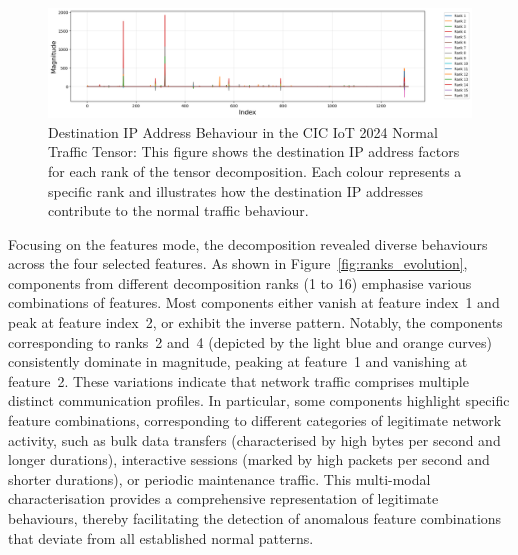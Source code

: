 \documentclass[pdflatex,sn-mathphys-num]{sn-jnl}
\theoremstyle{thmstyleone}
\theoremstyle{thmstyletwo}
\theoremstyle{thmstylethree}
\begin{document}
\begin{figure}[H]
    \centering
    \includegraphics[width=1.2\linewidth]{Destination IP mode.png}
   \caption{Destination IP Address Behaviour in the CIC IoT 2024 Normal Traffic Tensor: This figure shows the destination IP address factors for each rank of the tensor decomposition. Each colour represents a specific rank and illustrates how the destination IP addresses contribute to the normal traffic behaviour.}
\end{figure}

Focusing on the features mode, the decomposition revealed diverse behaviours across the four selected features. As shown in Figure~\ref{fig:ranks_evolution}, components from different decomposition ranks (1 to 16) emphasise various combinations of features. Most components either vanish at feature index~1 and peak at feature index~2, or exhibit the inverse pattern. Notably, the components corresponding to ranks~2 and~4 (depicted by the light blue and orange curves) consistently dominate in magnitude, peaking at feature~1 and vanishing at feature~2. These variations indicate that network traffic comprises multiple distinct communication profiles. In particular, some components highlight specific feature combinations, corresponding to different categories of legitimate network activity, such as bulk data transfers (characterised by high bytes per second and longer durations), interactive sessions (marked by high packets per second and shorter durations), or periodic maintenance traffic. This multi-modal characterisation provides a comprehensive representation of legitimate behaviours, thereby facilitating the detection of anomalous feature combinations that deviate from all established normal patterns.
\end{document}
